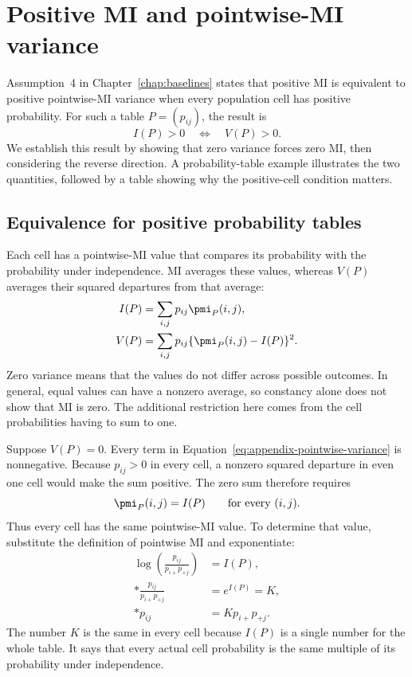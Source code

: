 \section{Positive MI and pointwise-MI variance}
\label{sec:mi-variance-equivalence}

Assumption~4 in Chapter~\ref{chap:baselines} states that positive MI is
equivalent to positive pointwise-MI variance when every population cell
has positive probability. For such a table \(P=(p_{ij})\), the result is
\begin{equation}
 I(P)>0\quad\Longleftrightarrow\quad V(P)>0.
 \label{eq:positive-mi-variance-equivalence}
\end{equation}
We establish this result by showing that zero variance forces zero MI,
then considering the reverse direction. A probability-table example
illustrates the two quantities, followed by a table showing why the
positive-cell condition matters.

\subsection{Equivalence for positive probability tables}

Each cell has a pointwise-MI value that compares its probability with
the probability under independence. MI averages these values, whereas
\(V(P)\) averages their squared departures from that average:
\begin{align}
 I(P)&=\sum_{i,j}p_{ij}\pmi_P(i,j),\\*
 V(P)&=\sum_{i,j}p_{ij}\{\pmi_P(i,j)-I(P)\}^2.
 \label{eq:appendix-pointwise-variance}
\end{align}
Zero variance means that the values do not differ across possible
outcomes. In general, equal values can have a nonzero average, so
constancy alone does not show that MI is zero. The additional restriction
here comes from the cell probabilities having to sum to one.

\medskip
{}

Suppose \(V(P)=0\). Every term in
Equation~\eqref{eq:appendix-pointwise-variance} is nonnegative. Because
\(p_{ij}>0\) in every cell, a nonzero squared departure in even one
cell would make the sum positive. The zero sum therefore requires
\begin{equation}
 \pmi_P(i,j)=I(P)\qquad\text{for every }(i,j).
\end{equation}
Thus every cell has the same pointwise-MI value. To determine that value,
substitute the definition of pointwise MI and exponentiate:
\begin{align}
 \log\left(\frac{p_{ij}}{p_{i+}p_{+j}}\right)&=I(P),\\*
 \frac{p_{ij}}{p_{i+}p_{+j}}&=e^{I(P)}=K,\\*
 p_{ij}&=Kp_{i+}p_{+j}.
 \label{eq:constant-pointwise-mi-ratio}
\end{align}
The number \(K\) is the same in every cell because \(I(P)\) is a
single number for the whole table. It says that every actual cell
probability is the same multiple of its probability under independence.

